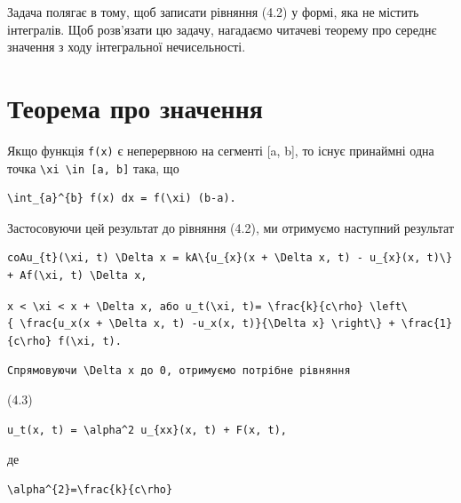\documentclass[
  ukrainian,
]{article}
\begin{document}
Задача полягає в тому, щоб записати рівняння (4.2) у формі, яка не
містить інтегралів. Щоб розв'язати цю задачу, нагадаємо читачеві теорему
про середнє значення з ходу інтегральної нечисельності.

\section{Теорема про
значення}\label{ux442ux435ux43eux440ux435ux43cux430-ux43fux440ux43e-ux437ux43dux430ux447ux435ux43dux43dux44f}

Якщо функція \texttt{f(x)} є неперервною на сегменті {[}a, b{]}, то
існує принаймні одна точка
\texttt{\textbackslash{}xi\ \textbackslash{}in\ {[}a,\ b{]}} така, що

\begin{verbatim}
\int_{a}^{b} f(x) dx = f(\xi) (b-a).
\end{verbatim}

Застосовуючи цей результат до рівняння (4.2), ми отримуємо наступний
результат

\begin{verbatim}
coAu_{t}(\xi, t) \Delta x = kA\{u_{x}(x + \Delta x, t) - u_{x}(x, t)\} + Af(\xi, t) \Delta x,
\end{verbatim}

\texttt{x\ \textless{}\ \textbackslash{}xi\ \textless{}\ x\ +\ \textbackslash{}Delta\ x,\ або\ \textquotesingle{}u\_t\textquotesingle{}(\textbackslash{}xi,\ t)\textquotesingle{}=\ \textbackslash{}frac\{k\}\{c\textbackslash{}rho\}\ \textbackslash{}left\textbackslash{}\{\ \textbackslash{}frac\{\textquotesingle{}u\_x\textquotesingle{}(x\ +\ \textbackslash{}Delta\ x,\ t)\ -\textquotesingle{}u\_x\textquotesingle{}(x,\ t)\}\{\textbackslash{}Delta\ x\}\ \textbackslash{}right\textbackslash{}\}\ +\ \textbackslash{}frac\{1\}\{c\textquotesingle{}\textbackslash{}rho\}\ f(\textbackslash{}xi,\ t).}

\begin{verbatim}
Спрямовуючи \Delta x до 0, отримуємо потрібне рівняння
\end{verbatim}

(4.3)

\begin{verbatim}
u_t(x, t) = \alpha^2 u_{xx}(x, t) + F(x, t),
\end{verbatim}

де

\begin{verbatim}
\alpha^{2}=\frac{k}{c\rho}
\end{verbatim}
\end{document}
